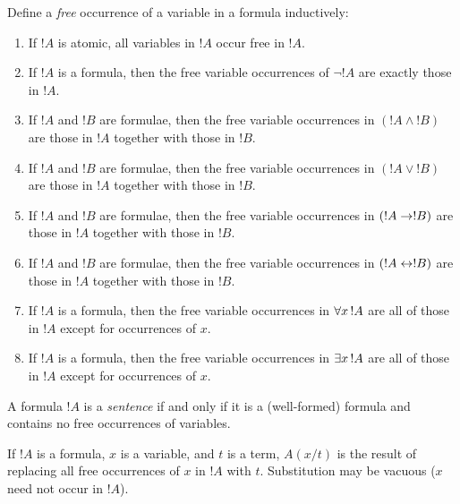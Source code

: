 \documentclass[syntax-and-semantics]{subfiles}
\begin{document}
\begin{defn}
Define a \emph{free} occurrence of a variable in a formula inductively:
\begin{enumerate}
\item If $!A$ is atomic, all variables in $!A$ occur free in $!A$.
\item If $!A$ is a formula, then the free variable occurrences of $\lnot !A$ are exactly those in $!A$.
\item If $!A$ and $!B$ are formulae, then the free variable occurrences in $(!A \land !B)$ are those in $!A$ together with those in $!B$.
\item If $!A$ and $!B$ are formulae, then the free variable occurrences in $(!A \lor !B)$ are those in $!A$ together with those in $!B$.
\item If $!A$ and $!B$ are formulae, then the free variable occurrences in $(!A \to !B)$ are those in $!A$ together with those in $!B$.
\item If $!A$ and $!B$ are formulae, then the free variable occurrences in $(!A \leftrightarrow !B)$ are those in $!A$ together with those in $!B$.
\item If $!A$ is a formula, then the free variable occurrences in $\lforall[x][!A]$ are all of those in $!A$ except for occurrences of $x$.
\item If $!A$ is a formula, then the free variable occurrences in $\lexists[x][!A]$ are all of those in $!A$ except for occurrences of $x$.
\end{enumerate}
\end{defn}

\begin{defn}[Sentence]
A formula $!A$ is a \emph{sentence} if and only if it is a (well-formed) formula and contains no free occurrences of variables.\end{defn}


\begin{defn}
If $!A$ is a formula, $x$ is a variable, and $t$ is a term, $A(x/t)$ is the result of replacing all free occurrences of $x$ in $!A$ with $t$. Substitution may be vacuous ($x$ need not occur in $!A$). \end{defn}
\end{document}
